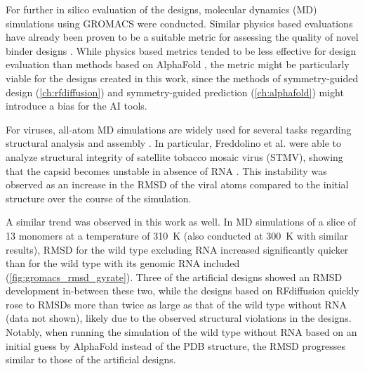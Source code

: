 For further in silico evaluation of the designs, molecular dynamics (MD) simulations using GROMACS \cite{gromacs_general} were conducted. Similar physics based evaluations have already been proven to be a suitable metric for assessing the quality of novel binder designs \cite{physics_binder_design}. While physics based metrics tended to be less effective for design evaluation than methods based on AlphaFold \cite{binder_design}, the metric might be particularly viable for the designs created in this work, since the methods of symmetry-guided design (\autoref{ch:rfdiffusion}) and symmetry-guided prediction (\autoref{ch:alphafold}) might introduce a bias for the AI tools. 

For viruses, all-atom MD simulations are widely used for several tasks regarding structural analysis and assembly \cite{md_viral_analysis_review}. In particular, Freddolino et al. were able to analyze structural integrity of satellite tobacco mosaic virus  (STMV), showing that the capsid becomes unstable in absence of RNA \cite{md_tmv_stability}. This instability was observed as an increase in the RMSD of the viral atoms compared to the initial structure over the course of the simulation. 

A similar trend was observed in this work as well. In MD simulations of a slice of 13 monomers at a temperature of \SI{310}{\kelvin} (also conducted at \SI{300}{\kelvin} with similar results), RMSD for the wild type excluding RNA increased significantly quicker than for the wild type with its genomic RNA included (\autoref{fig:gromacs_rmsd_gyrate}). Three of the artificial designs showed an RMSD development in-between these two, while the designs based on RFdiffusion quickly rose to RMSDs more than twice as large as that of the wild type without RNA (data not shown), likely due to the observed structural violations in the designs. Notably, when running the simulation of the wild type without RNA based on an initial guess by AlphaFold instead of the PDB structure, the RMSD progresses similar to those of the artificial designs.

